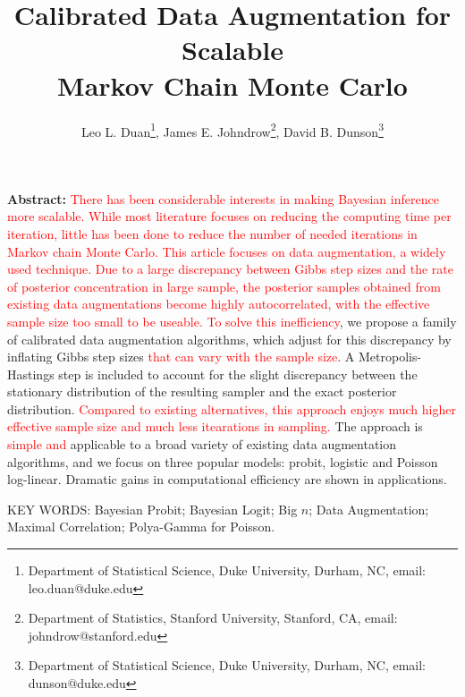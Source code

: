 \documentclass[11pt]{article}
\newcommand{\leo}[1]{{\textcolor{red}{#1}}}
\begin{document}
\title{Calibrated Data Augmentation for Scalable \\ Markov Chain Monte Carlo}



\author{ Leo L. Duan\thanks{Department of Statistical Science, Duke University, Durham, NC, email: leo.duan@duke.edu},
     James E. Johndrow\thanks{Department of Statistics, Stanford University, Stanford, CA, email: johndrow@stanford.edu},
     David B. Dunson\thanks{Department of Statistical Science, Duke University, Durham, NC, email: dunson@duke.edu}
     }

\editor{}
\maketitle


{\bf Abstract:} 
\leo{There has been considerable interests in making Bayesian inference more scalable.
While most literature focuses on reducing the computing time per
iteration, little has been done to reduce the number of needed iterations in
Markov chain Monte Carlo. This article focuses on data augmentation,
a widely used technique. Due to a
large discrepancy between Gibbs step sizes and the rate of posterior concentration
in large sample,
the posterior samples obtained from existing data augmentations become highly
autocorrelated, with the effective
sample size too small to be useable. 
   To solve this
inefficiency}, we propose a family of calibrated data augmentation algorithms, which adjust for this discrepancy by inflating Gibbs step sizes \leo{that
can vary with the sample size}.  A Metropolis-Hastings step is included to account for the slight discrepancy between the stationary distribution of the resulting sampler and the exact posterior distribution. \leo{Compared to existing alternatives, this approach enjoys much higher effective sample
size and much less itearations in sampling.} The approach is \leo{simple and}  applicable to a broad variety of existing data augmentation algorithms, and we focus on three popular models: probit, logistic and Poisson log-linear.   Dramatic gains in computational efficiency are shown in applications.
\vskip 12pt 

{\noindent  KEY WORDS:   Bayesian Probit; Bayesian Logit; Big $n$; Data Augmentation; Maximal Correlation; Polya-Gamma for Poisson.}

\vfill

\newpage
\end{document}
